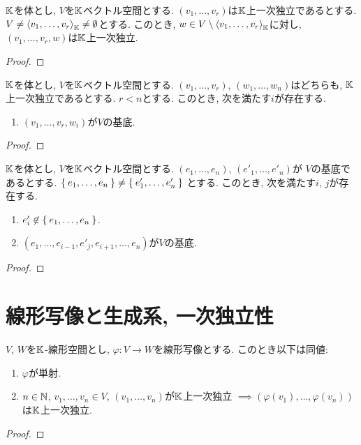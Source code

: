 \begin{prop}
$\mathbb{K}$を体とし,
  $V$を$\mathbb{K}$ベクトル空間とする.
  $(v_1,\ldots, v_r)$は$\mathbb{K}$上一次独立であるとする.  
  $V\neq\Braket{v_1,\ldots, v_r}_{\mathbb{K}}\neq \emptyset$とする.
  このとき, $w\in V\setminus\Braket{v_1,\ldots, v_r}_{\mathbb{K}}$に対し,
  $(v_1,\ldots,v_{r},w)$は$\mathbb{K}$上一次独立.
\end{prop}
\begin{proof}\end{proof}

\begin{prop}
$\mathbb{K}$を体とし,
  $V$を$\mathbb{K}$ベクトル空間とする.
  $(v_1,\ldots, v_r)$,
  $(w_1,\ldots, w_n)$はどちらも,
  $\mathbb{K}$上一次独立であるとする.  
$r<n$とする.
このとき, 次を満たす$i$が存在する.
\begin{enumerate}
\item $(v_1,\ldots,v_{r},w_{i})$が$V$の基底.
\end{enumerate}
\end{prop}
\begin{proof}\end{proof}

\begin{prop}
  $\mathbb{K}$を体とし,
  $V$を$\mathbb{K}$ベクトル空間とする.
  $(e_1,\ldots, e_n)$,
  $(e'_1,\ldots, e'_n)$が
  $V$の基底であるとする.
$\Set{e_1,\ldots, e_n}\neq \Set{e'_1,\ldots, e'_n}$
とする.
このとき, 次を満たす$i$, $j$が存在する.
\begin{enumerate}
\item $e'_i \not\in \Set{e_1,\ldots,e_n}$.
\item $(e_1,\ldots,e_{i-1},e'_{j},e_{i+1},\ldots,e_n)$が$V$の基底.
\end{enumerate}
\end{prop}
\begin{proof}\end{proof}


\section{線形写像と生成系, 一次独立性}
\begin{prop}
  $V$, $W$を$\mathbb{K}$-線形空間とし,
  $\varphi\colon V\to W$を線形写像とする.
  このとき以下は同値:
  \begin{enumerate}
  \item $\varphi$が単射.
  \item $n\in \mathbb{N}$, $v_1,\ldots,v_n\in V$,
    $(v_1,\ldots,v_n)$が$\mathbb{K}$上一次独立
    $\implies (\varphi(v_1),\ldots,\varphi(v_n))$は$\mathbb{K}$上一次独立.
  \end{enumerate}
\end{prop}
\begin{proof}\end{proof}

